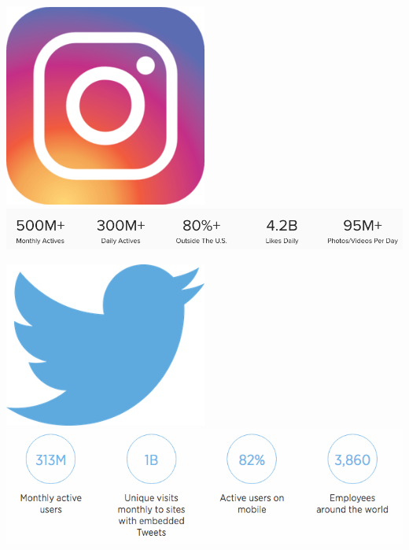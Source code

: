 \documentclass{beamer}
\begin{document}
\begin{frame}[plain]
  \begin{center}
      \includegraphics[width=0.5\textwidth]{img/instagram-logo.png} \\
      \includegraphics[width=\textwidth]{img/instagram-stats.png} \\
  \end{center}
\end{frame}

\begin{frame}[plain]
  \begin{center}
      \includegraphics[width=0.5\textwidth]{img/twitter-logo.png} \\
      \includegraphics[width=\textwidth]{img/twitter-stats.png} 
  \end{center}
\end{frame}
\end{document}
